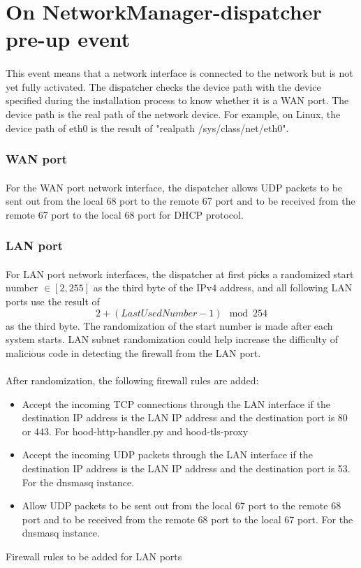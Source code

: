 \documentclass[mscthesis]{usiinfthesis}
\begin{document}
\section{On NetworkManager-dispatcher pre-up event}
\paragraph{}
This event means that a network interface is connected to the network but is not yet fully activated. The dispatcher checks the device path with the device specified during the installation process to know whether it is a WAN port. The device path is the real path of the network device. For example, on Linux, the device path of eth0 is the result of "realpath /sys/class/net/eth0".
\subsubsection{WAN port}
\paragraph{}
For the WAN port network interface, the dispatcher allows UDP packets to be sent out from the local 68 port to the remote 67 port and to be received from the remote 67 port to the local 68 port for DHCP protocol.
\subsubsection{LAN port}
\paragraph{}
For LAN port network interfaces, the dispatcher at first picks a randomized start number \(\in [2, 255]\) as the third byte of the IPv4 address, and all following LAN ports use the result of \[2 + (Last Used Number - 1) \mod 254\] as the third byte. The randomization of the start number is made after each system starts. LAN subnet randomization could help increase the difficulty of malicious code in detecting the firewall from the LAN port.
\paragraph{}
After randomization, the following firewall rules are added:
\begin{table}[H]
  \begin{itemize}
    \item Accept the incoming TCP connections through the LAN interface if the destination IP address is the LAN IP address and the destination port is 80 or 443. For hood-http-handler.py and hood-tls-proxy
    \item Accept the incoming UDP packets through the LAN interface if the destination IP address is the LAN IP address and the destination port is 53. For the dnsmasq instance.
    \item Allow UDP packets to be sent out from the local 67 port to the remote 68 port and to be received from the remote 68 port to the local 67 port. For the dnsmasq instance.
  \end{itemize}
  \caption{Firewall rules to be added for LAN ports}
  \label{lst:LAN-rules}
\end{table}
\end{document}
